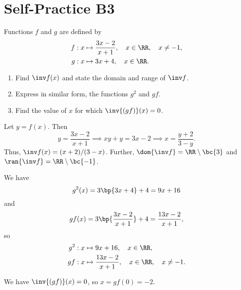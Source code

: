 \section{Self-Practice B3}

\begin{problem}
    Functions $f$ and $g$ are defined by
    \begin{align*}
        f &: x \mapsto \frac{3x-2}{x+1}, \quad x \in \RR, \quad x \neq -1,\\
        g &: x \mapsto 3x + 4, \quad x \in \RR.
    \end{align*}

    \begin{enumerate}
        \item Find $\inv f(x)$ and state the domain and range of $\inv f$.
        \item Express in similar form, the functions $g^2$ and $gf$.
        \item Find the value of $x$ for which $\inv{(gf)} (x) = 0$.
    \end{enumerate}
\end{problem}
\begin{solution}
    \begin{ppart}
        Let $y = f(x)$. Then \[y = \frac{3x-2}{x+1} \implies xy + y = 3x - 2 \implies x = \frac{y+2}{3-y}.\] Thus, $\inv f(x) = (x+2)/(3-x)$. Further, $\dom{\inv f} = \RR \setminus \bc{3}$ and $\ran{\inv f} = \RR \setminus \bc{-1}$.
    \end{ppart}
    \begin{ppart}
        We have \[g^2(x) = 3\bp{3x+4} + 4 = 9x + 16\] and \[gf(x) = 3\bp{\frac{3x-2}{x+1}} + 4 = \frac{13x-2}{x+1},\] so
        \begin{align*}
            g^2 &: x \mapsto 9x + 16, \quad x \in \RR,\\
            gf &: x \mapsto \frac{13x-2}{x+1}, \quad x \in \RR, \quad x \neq -1.
        \end{align*}
    \end{ppart}
    \begin{ppart}
        We have $\inv{(gf)}(x) = 0$, so $x = gf(0) = -2$.
    \end{ppart}
\end{solution}

